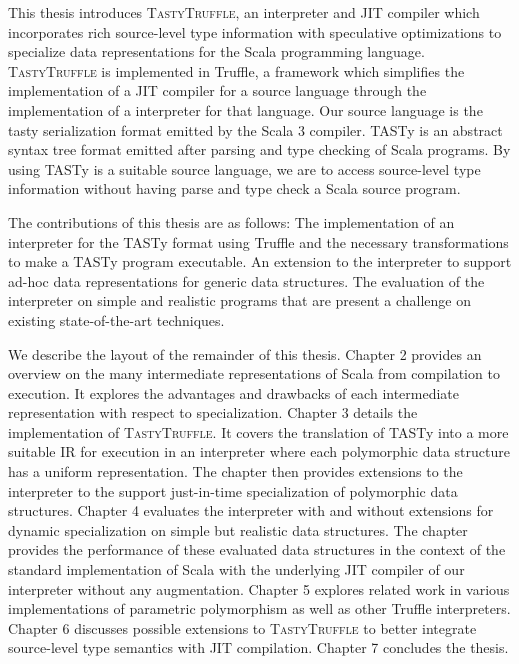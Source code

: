 This thesis introduces \textsc{TastyTruffle}, an interpreter and JIT compiler which incorporates rich source-level type information with speculative optimizations to specialize data representations for the Scala programming language.
\textsc{TastyTruffle} is implemented in Truffle, a framework which simplifies the implementation of a JIT compiler for a source language through the implementation of a interpreter for that language. 
Our source language is the \acrfull{tasty} serialization format emitted by the Scala 3 compiler.
TASTy is an abstract syntax tree format emitted after parsing and type checking of Scala programs.
By using TASTy is a suitable source language, we are to access source-level type information without having parse and type check a Scala source program.

The contributions of this thesis are as follows: 
The implementation of an interpreter for the TASTy format using Truffle and the necessary transformations to make a TASTy program executable.
An extension to the interpreter to support ad-hoc data representations for generic data structures.
The evaluation of the interpreter on simple and realistic programs that are present a challenge on existing state-of-the-art techniques.

We describe the layout of the remainder of this thesis.
Chapter 2 provides an overview on the many intermediate representations of Scala from compilation to execution.
It explores the advantages and drawbacks of each intermediate representation with respect to specialization.
Chapter 3 details the implementation of \textsc{TastyTruffle}.
It covers the translation of TASTy into a more suitable IR for execution in an interpreter where each polymorphic data structure has a uniform representation.
The chapter then provides extensions to the interpreter to the support just-in-time specialization of polymorphic data structures.
Chapter 4 evaluates the interpreter with and without extensions for dynamic specialization on simple but realistic data structures.
The chapter provides the performance of these evaluated data structures in the context of the standard implementation of Scala with the underlying JIT compiler of our interpreter without any augmentation.
Chapter 5 explores related work in various implementations of parametric polymorphism as well as other Truffle interpreters.
Chapter 6 discusses possible extensions to \textsc{TastyTruffle} to better integrate source-level type semantics with JIT compilation.
Chapter 7 concludes the thesis.